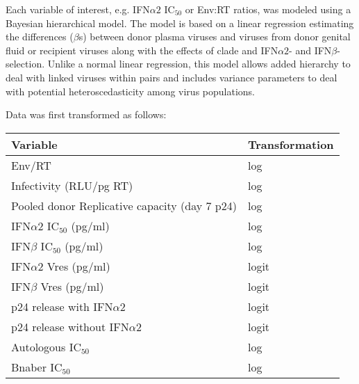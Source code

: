 \documentclass[12pt]{article}
\newcommand{\ifna}{IFN${\alpha 2}$}
\newcommand{\ifnb}{IFN${\beta}$}
\newcommand{\icFifty}{IC$_{50}$}
\begin{document}
Each variable of interest, e.g. \ifna{} \icFifty{} or Env:RT ratios, was modeled using a Bayesian hierarchical model. The model is based on a linear regression estimating the differences ($\beta$s) between donor plasma viruses and viruses from donor genital fluid or recipient viruses along with the effects of clade and \ifna{}- and \ifnb{}-selection. Unlike a normal linear regression, this model allows added hierarchy to deal with linked viruses within pairs and includes variance parameters to deal with potential heteroscedasticity among virus populations.


Data was first transformed as follows:

\begin{table}[ht]
\centering
\begin{tabular}{|l|l|}
      \hline
      Variable                                      & Transformation \\ 
      \hline
      Env/RT                                        & log            \\ 
      Infectivity (RLU/pg RT)                       & log            \\ 
      Pooled donor Replicative capacity (day 7 p24) & log            \\ 
      \ifna{} \icFifty{} (pg/ml)                    & log            \\ 
      \ifnb{} \icFifty{} (pg/ml)                    & log            \\ 
      \ifna{} Vres (pg/ml)                          & logit          \\ 
      \ifnb{} Vres (pg/ml)                          & logit          \\ 
      p24 release with \ifna{}                      & logit          \\ 
      p24 release without \ifna{}                   & logit          \\ 
      Autologous \icFifty{}                         & log            \\ 
      Bnaber \icFifty{}                             & log            \\ 
      \hline
\end{tabular}
\end{table}
\end{document}
